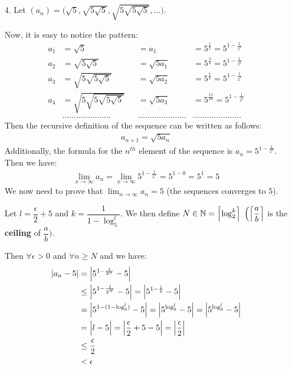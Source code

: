 \documentclass[11pt]{article}
\DeclarePairedDelimiter\abs{\lvert}{\rvert}%
\DeclarePairedDelimiter\absb{\Big\lvert}{\Big\rvert}%
\DeclarePairedDelimiter{\ceilb}{\Big\lceil}{\Big\rceil}
\newcommand{\nats}{\mathbb{N}}
\begin{document}
\begin{itemize}
        \newpage
        \item[4.]
            Let $(a_n) = \Big(\sqrt{5}, \sqrt{5\sqrt{5}}, \sqrt{5\sqrt{5\sqrt{5}}}, \dots\Big)$.

            Now, it is easy to notice the pattern:
            \begin{align*}
                a_1 &= \sqrt{5}                         &&= a_1         &= 5^{\frac{1}{2}}   = 5^{1 - \frac{1}{2^{1}}}\\
                a_2 &= \sqrt{5\sqrt{5}}                 &&= \sqrt{5a_1} &= 5^{\frac{3}{4}}   = 5^{1 - \frac{1}{2^{2}}}\\
                a_3 &= \sqrt{5\sqrt{5\sqrt{5}}}         &&= \sqrt{5a_2} &= 5^{\frac{7}{8}}   = 5^{1 - \frac{1}{2^{3}}}\\
                a_4 &= \sqrt{5\sqrt{5\sqrt{5\sqrt{5}}}} &&= \sqrt{5a_3} &= 5^{\frac{15}{16}} = 5^{1 - \frac{1}{2^{4}}}\\
                    & .....................             && ..................... & .....................
            \end{align*}
            Then the recursive definition of the sequence can be written as follows:
            \begin{align*}
                a_{n + 1} = \sqrt{5a_{n}}
            \end{align*}
            Additionally, the formula for the $n^{th}$ element of the sequence
            is $a_n = 5^{1 - \frac{1}{2^{n}}}$. Then we have:
            \begin{align*}
                \lim_{x \to \infty}a_n = \lim_{x \to \infty}5^{1 - \frac{1}{2^{n}}} = 5^{1 - 0} = 5^1 = 5
            \end{align*}
            We now need to prove that $\lim_{n \to \infty}a_n = 5$ (the
            sequences converges to $5$).

            Let $l = \dfrac{\epsilon}{2} + 5$ and $k = \dfrac{1}{1 - \log_5^{l}}$.
            We then define $N \in \nats = \ceilb{\log_2^{k}}$
            $\Big(\ceilb{\dfrac{a}{b}}$ is the \textbf{ceiling} of $\dfrac{a}{b}\Big)$.

            Then $\forall \epsilon > 0$ and $\forall n \geq N$ and we have:
            \begin{align*}
                \abs{a_n - 5} &= \absb{5^{1 - \frac{1}{2^{n}}} - 5}\\
                              &\leq \absb{5^{1 - \frac{1}{2^{N}}} - 5}
                                   = \absb{5^{1 - \frac{1}{k}} - 5}\\
                              &= \absb{5^{1 - (1 - \log_5^l)} - 5}
                                   = \absb{5^{\log_5^l} - 5}
                                   = \absb{5^{\log_5^l} - 5}\\
                              &= \absb{l - 5}
                                   = \absb{\frac{\epsilon}{2} + 5 - 5}
                                   = \absb{\frac{\epsilon}{2}}\\
                              &\leq \frac{\epsilon}{2}\\
                              &< \epsilon
            \end{align*}


\end{itemize}
\end{document}
